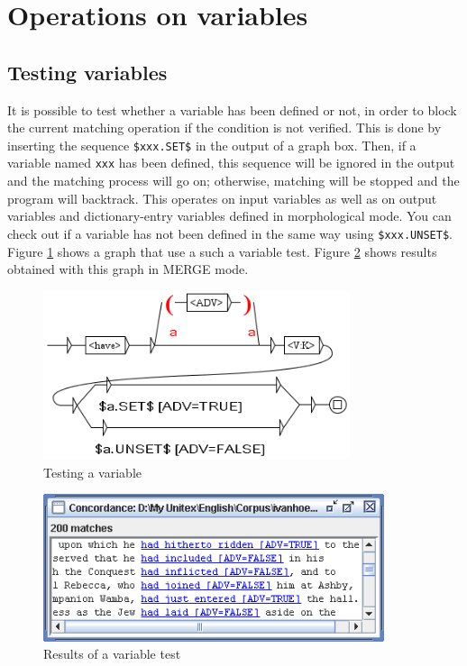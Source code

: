 \section{Operations on variables}
\label{section-ops-on-variables}
\subsection{Testing variables}

\noindent It is possible to test whether a variable has been defined or not, in
order to block the current matching operation if the condition is not verified.
This is done by inserting the sequence \verb+$xxx.SET$+ in the output of a
graph box. Then, if a variable named \verb+xxx+ has been defined, this sequence
will be ignored in the output and the matching process will go on; otherwise, matching
will be stopped and the program will backtrack. This operates on
input variables as well as on output variables and dictionary-entry variables defined in
morphological mode. You can check out if a variable has not been defined in the
same way using \verb+$xxx.UNSET$+. Figure \ref{fig-testing-a-variable} shows
a graph that use a such a variable test. Figure
\ref{fig-testing-a-variable-results} shows results obtained with this graph in
MERGE mode.

\begin{figure}[!ht]
\begin{center}
\includegraphics[width=9cm]{resources/img/fig6-29b.png}
\caption{Testing a variable\label{fig-testing-a-variable}}
\end{center}
\end{figure}

\begin{figure}[!ht]
\begin{center}
\includegraphics[width=10cm]{resources/img/fig6-29c.png}
\caption{Results of a variable test\label{fig-testing-a-variable-results}}
\end{center}
\end{figure}


